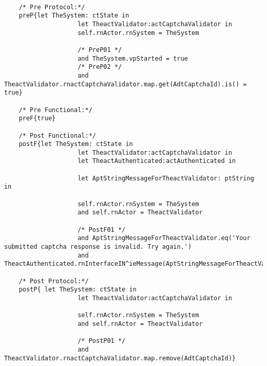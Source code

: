 	\scriptsize
	\vspace{0.5cm}
	\begin{lstlisting}[style=MessirStyle,firstnumber=auto,captionpos=b,caption={\msrmessir (MCL-oriented) specification of the operation \emph{oeCaptchaInvalid}.},label=OM-actCaptchaValidator-oeCaptchaInvalid-MCL-LST]

	/* Pre Protocol:*/ 
	preP{let TheSystem: ctState in
	  				let TheactValidator:actCaptchaValidator in
					self.rnActor.rnSystem = TheSystem
	  
					/* PreP01 */
					and TheSystem.vpStarted = true
					/* PreP02 */
					and TheactValidator.rnactCaptchaValidator.map.get(AdtCaptchaId).is() = true}
	
	/* Pre Functional:*/
	preF{true}
	
	/* Post Functional:*/ 
	postF{let TheSystem: ctState in
					let TheactValidator:actCaptchaValidator in
					let TheactAuthenticated:actAuthenticated in
					
					let AptStringMessageForTheactValidator: ptString in
					  
					self.rnActor.rnSystem = TheSystem
					and self.rnActor = TheactValidator
					
					/* PostF01 */
					and AptStringMessageForTheactValidator.eq('Your submitted captcha response is invalid. Try again.')
					and TheactAuthenticated.rnInterfaceIN^ieMessage(AptStringMessageForTheactValidator)}
	
	/* Post Protocol:*/ 
	postP{ let TheSystem: ctState in
				  	let TheactValidator:actCaptchaValidator in
				  
				  	self.rnActor.rnSystem = TheSystem
				  	and self.rnActor = TheactValidator
				  	
				  	/* PostP01 */
					and TheactValidator.rnactCaptchaValidator.map.remove(AdtCaptchaId)}
	
	\end{lstlisting}
	\normalsize 
	
	
	
	





